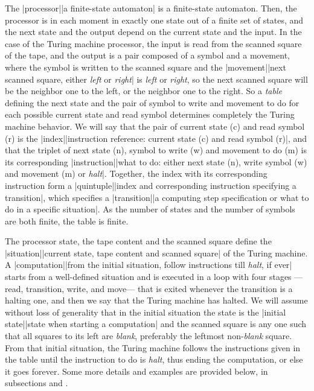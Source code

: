 \dest
The |processor||a finite-state automaton|
is a finite-state automaton.
Then, the processor is in
each moment in exactly one state out of a finite set of states,
and the next state and the output depend on the current
state and the input.
In the case of the Turing machine processor,
the input is read from the scanned square of the tape, and
the output is a pair composed of a symbol and a movement,
where the symbol is written to the scanned square and
the |movement||next scanned square,
 either {\em left} or {\em right}|
is {\em left} or {\em right},
so the next scanned square will be
the neighbor one to the left,
or the neighbor one to the right.
So a {\em table} defining the next state
and the pair of symbol to write and movement to do
for each possible current state and read symbol
determines completely the Turing machine behavior.
We will say that the pair of current state ({\sc c})
and read symbol ({\sc r}) is the
|index||instruction reference:
 current state ({\sc c}) and read symbol ({\sc r})|,
and that the triplet of next state ({\sc n}),
symbol to write ({\sc w}) and movement to do ({\sc m})
is its corresponding
|instruction||what to do: either next state ({\sc n}),
 write symbol ({\sc w}) and movement ({\sc m}) or {\em halt}|.
Together, the index with its corresponding instruction
form a |quintuple||index and corresponding instruction
 specifying a transition|,
which specifies a |transition||a computing step
 specification or what to do in a specific situation|.
As the number of states and the number of symbols are both finite,
the table is finite.

\dest
The processor state, the tape content and the scanned square
define the |situation||current state,
 tape content and scanned square| of the Turing machine.
A |computation||from the initial situation,
 follow instructions till {\em halt}, if ever|
starts from a well-defined situation and is executed in a loop
with four stages ---read, transition, write, and move---
that is exited whenever the transition is a halting one,
and then we say that the Turing machine has halted.
We will assume without loss of generality that
in the initial situation the state is the
|initial state||state when starting a computation|
and the scanned square is any one such that
all squares to its left are {\em blank},
preferably the leftmost non-{\em blank} square.
From that initial situation, the Turing machine
follows the instructions given in the table
until the instruction to do is {\em halt},
thus ending the computation, or else it goes forever.
Some more details and examples are provided below,
in subsections  and .


